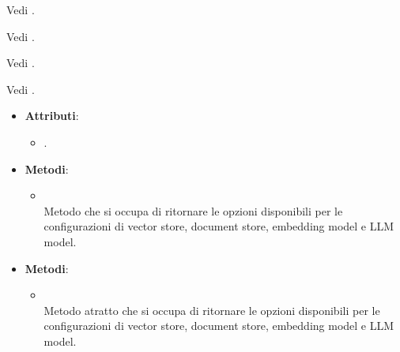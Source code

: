 \documentclass[10pt, a4paper]{article}
\begin{document}
Vedi .

Vedi .

Vedi .

Vedi .


\label{GetConfigurationOptionsDettaglio}
\begin{itemize}
    \item \textbf{Attributi}:
    \begin{itemize}
        \item {}.
    \end{itemize} 
    \item \textbf{Metodi}:
    \begin{itemize}
        \item {}\\
        Metodo che si occupa di ritornare le opzioni disponibili per le configurazioni di vector store, document store, embedding model e LLM model.
    \end{itemize}   
\end{itemize}


\label{GetConfigurationOptionsPortDettaglio}
\begin{itemize}
    \item \textbf{Metodi}:
    \begin{itemize}
        \item {}\\
        Metodo atratto che si occupa di ritornare le opzioni disponibili per le configurazioni di vector store, document store, embedding model e LLM model.
    \end{itemize}   
\end{itemize}
\end{document}
